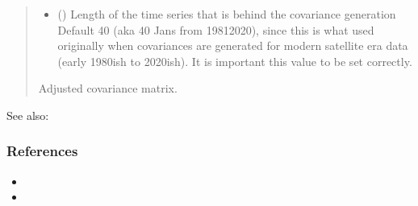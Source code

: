 \documentclass[letterpaper,10pt,english]{sphinxmanual}
\begin{document}
\begin{fulllineitems}
\begin{quote}
\begin{description}
\begin{itemize}
\item {}
\sphinxAtStartPar
{} () \textendash{} Length of the time series that is behind the covariance generation
Default 40 (aka 40 Jans from 1981\sphinxhyphen{}2020), since this is what used
originally when covariances are generated for modern satellite era
data (early 1980\sphinxhyphen{}ish to 2020\sphinxhyphen{}ish). It is important this value to
be set correctly.

\end{itemize}

\sphinxAtStartPar
Adjusted covariance matrix.

\sphinxAtStartPar
{}

\end{description}\end{quote}


\begin{sphinxseealso}{See also:}

\sphinxAtStartPar
{\hyperref[\detokenize{misc:glomar_gridding.covariance_tools.explained_variance_clip}]{}}


\end{sphinxseealso}

\subsubsection*{References}
\begin{itemize}
\item {}
\sphinxAtStartPar
{}

\item {}
\sphinxAtStartPar
{}

\end{itemize}

\end{fulllineitems}

\end{document}
